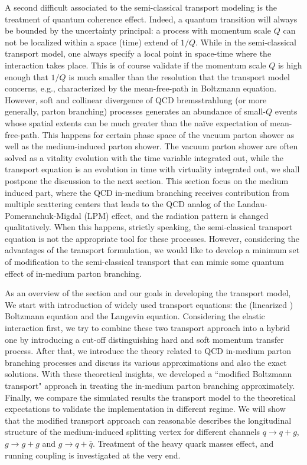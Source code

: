 A second difficult associated to the semi-classical transport modeling is the treatment of quantum coherence effect.
Indeed, a quantum transition will always be bounded by the uncertainty principal: a process with momentum scale $Q$ can not be localized within a space (time) extend of $1/Q$.
While in the semi-classical transport model, one always specify a local point in space-time where the interaction takes place.
This is of course validate if the momentum scale $Q$ is high enough that $1/Q$ is much smaller than the resolution that the transport model concerns, e.g., characterized by the mean-free-path in Boltzmann equation.
However, soft and collinear divergence of QCD bremsstrahlung (or more generally, parton branching) processes generates an abundance of small-$Q$ events whose spatial extents can be much greater than the na\"ive expectation of mean-free-path. 
This happens for certain phase space of the vacuum parton shower as well as the medium-induced parton shower.
The vacuum parton shower are often solved as a vitality evolution with the  time variable integrated out, while the transport equation is an evolution in time with virtuality integrated out, we shall postpone the discussion to the next section.
This section focus on the medium induced part, where the QCD in-medium branching receives contribution from multiple scattering centers that leads to the QCD analog of the Landau-Pomeranchuk-Migdal (LPM) effect, and the radiation pattern is changed qualitatively.
When this happens, strictly speaking, the semi-classical transport equation is not the appropriate tool for these processes.
However, considering the advantages of the transport formulation, we would like to develop a minimum set of modification to the semi-classical transport that can mimic some quantum effect of in-medium parton branching.


As an overview of the section and our goals in developing the transport model,
We start with introduction of widely used transport equations: the (linearized ) Boltzmann equation and the Langevin equation.
Considering the elastic interaction first, we try to combine these two transport approach into a hybrid one by introducing a cut-off distinguishing hard and soft momentum transfer process.
After that, we introduce the theory related to QCD in-medium parton branching processes and discuss its various approximations and also the exact solutions.
With these theoretical insights, we developed a ``modified Boltzmann transport" approach in treating the in-medium parton branching approximately.
Finally, we compare the simulated results the transport model to the theoretical expectations to validate the implementation in different regime.
We will show that the modified transport approach can reasonable describes the longitudinal structure of the medium-induced splitting vertex for different channels $q\rightarrow q+g$, $g\rightarrow g+g$ and $g\rightarrow q+\bar{q}$.
Treatment of the heavy quark masses effect, and running coupling is investigated at the very end.


